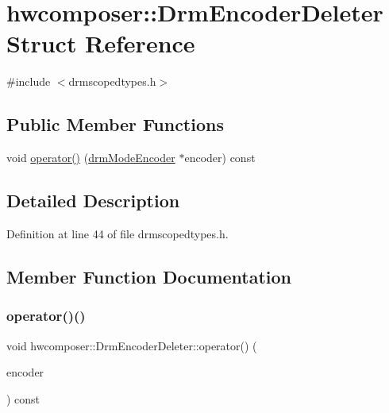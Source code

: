 \hypertarget{structhwcomposer_1_1DrmEncoderDeleter}{}\section{hwcomposer\+:\+:Drm\+Encoder\+Deleter Struct Reference}
\label{structhwcomposer_1_1DrmEncoderDeleter}


{\ttfamily \#include $<$drmscopedtypes.\+h$>$}

\subsection*{Public Member Functions}
\begin{DoxyCompactItemize}
\item 
void \mbox{\hyperlink{structhwcomposer_1_1DrmEncoderDeleter_a1b4a4962fa31546fd6dc2f1ff2c161e2}{operator()}} (\mbox{\hyperlink{drmscopedtypes_8h_a6a3ef235514bbe2e938575fc4d2c919c}{drm\+Mode\+Encoder}} $\ast$encoder) const
\end{DoxyCompactItemize}


\subsection{Detailed Description}


Definition at line 44 of file drmscopedtypes.\+h.



\subsection{Member Function Documentation}
\mbox{\label{structhwcomposer_1_1DrmEncoderDeleter_a1b4a4962fa31546fd6dc2f1ff2c161e2}} 
\subsubsection{\texorpdfstring{operator()()}{operator()()}}
{\footnotesize\ttfamily void hwcomposer\+::\+Drm\+Encoder\+Deleter\+::operator() (\begin{DoxyParamCaption}\item[{\mbox{\hyperlink{drmscopedtypes_8h_a6a3ef235514bbe2e938575fc4d2c919c}{drm\+Mode\+Encoder}} $\ast$}]{encoder }\end{DoxyParamCaption}) const}



